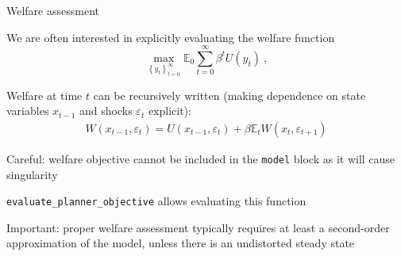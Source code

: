 \documentclass[handout,usepdftitle=false,xcolor=dvipsnames,aspectratio=169]{beamer}
\begin{document}
\begin{frame}{Welfare assessment}
  \begin{witemize}
    \item We are often interested in explicitly evaluating the welfare function
    \begin{equation}
      \max_{\left\{y_t\right\}_{t=0}^\infty} \mathbb{E}_0 \sum_{t=0}^\infty\beta^{t}U(y_t)  \: ,
    \end{equation}
    \item Welfare at time $t$ can be recursively written (making dependence on state variables $x_{t-1}$ and shocks $\varepsilon_t$ explicit):
    \begin{align}
      W\left( x_{t-1}, \varepsilon_t \right) = U\left( x_{t-1}, \varepsilon_t \right) + \beta \mathbb{E}_t W\left( x_{t}, \varepsilon_{t+1} \right)
    \end{align}
    \item Careful: welfare objective cannot be included in the \texttt{model} block as it will cause singularity
    \item \texttt{evaluate\_planner\_objective} allows evaluating this function
    \item Important: proper welfare assessment typically requires at least a second-order approximation of the model, unless there is an undistorted steady state \parencite{Woodford2002}
  \end{witemize}
\end{frame}
\end{document}
